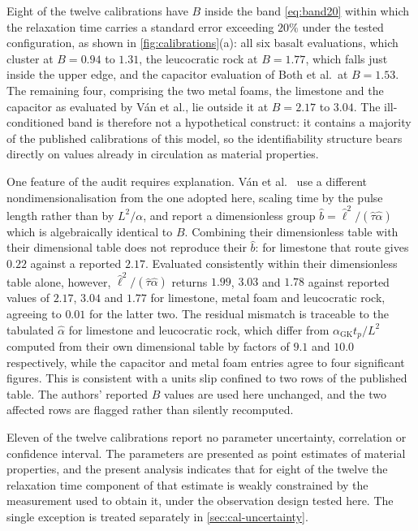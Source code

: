 \documentclass[preprint,12pt,a4paper]{elsarticle}
\theoremstyle{plain}
\theoremstyle{definition}
\theoremstyle{remark}
\newcommand{\Bnum}{B}
\begin{document}
Eight of the twelve calibrations have $\Bnum$ inside the band
\eqref{eq:band20} within which the relaxation time carries a standard error
exceeding $20\%$ under the tested configuration, as shown in \cref{fig:calibrations}(a): all six basalt evaluations,
which cluster at $\Bnum = 0.94$ to $1.31$, the leucocratic rock at
$\Bnum = 1.77$, which falls just inside the upper edge, and the capacitor
evaluation of Both et al.\ at $\Bnum = 1.53$. The remaining four, comprising
the two metal foams, the limestone and the capacitor as evaluated by V\'an
et al., lie outside it at $\Bnum = 2.17$ to $3.04$. The ill-conditioned band is
therefore not a hypothetical construct: it contains a majority of the published
calibrations of this model, so the identifiability structure bears directly on
values already in circulation as material properties.


One feature of the audit requires explanation. V\'an et al.\ \cite{Van2017} use a different
nondimensionalisation from the one adopted here, scaling time by the pulse
length rather than by $L^{2}/\alpha$, and report a dimensionless group
$\hat{b} = \hat{\ell}^{2}/(\hat{\tau}\hat{\alpha})$ which is algebraically
identical to $\Bnum$. Combining their dimensionless table with their
dimensional table does not reproduce their $\hat{b}$: for limestone that route
gives $0.22$ against a reported $2.17$. Evaluated consistently within their
dimensionless table alone, however, $\hat{\ell}^{2}/(\hat{\tau}\hat{\alpha})$
returns $1.99$, $3.03$ and $1.78$ against reported values of $2.17$, $3.04$ and
$1.77$ for limestone, metal foam and leucocratic rock, agreeing to $0.01$ for
the latter two. The residual mismatch is traceable to the tabulated
$\hat{\alpha}$ for limestone and leucocratic rock, which differ from
$\alpha_{\mathrm{GK}} t_{p}/L^{2}$ computed from their own dimensional table by
factors of $9.1$ and $10.0$ respectively, while the capacitor and metal foam
entries agree to four significant figures. This is consistent with a units slip
confined to two rows of the published table. The authors' reported $\Bnum$
values are used here unchanged, and the two affected rows are flagged rather
than silently recomputed.

Eleven of the twelve calibrations report no parameter
uncertainty, correlation or confidence interval. The parameters are presented
as point estimates of material properties, and the present analysis indicates
that for eight of the twelve the relaxation time component of that estimate is
weakly constrained by the measurement used to obtain it, under the observation
design tested here. The single exception is treated separately in
\cref{sec:cal-uncertainty}.
\end{document}

